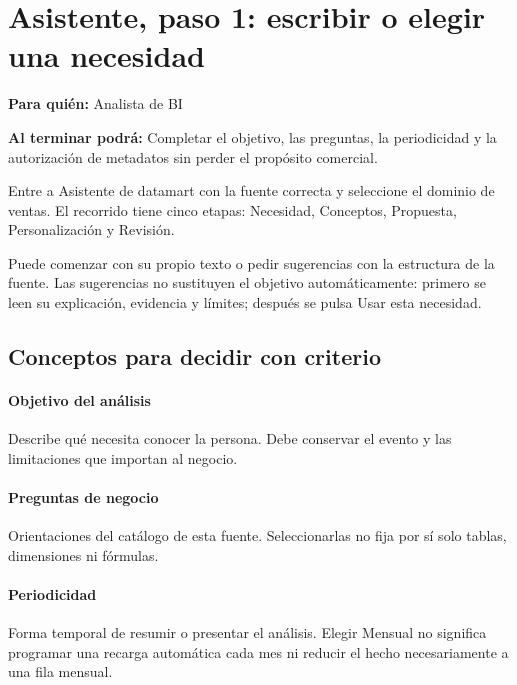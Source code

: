 
\section{Asistente, paso 1: escribir o elegir una necesidad}
\label{unidad:BI02}
\textbf{Para quién:} Analista de BI\par
\textbf{Al terminar podrá:} Completar el objetivo, las preguntas, la periodicidad y la autorización de metadatos sin perder el propósito comercial.

Entre a Asistente de datamart con la fuente correcta y seleccione el dominio de ventas. El recorrido tiene cinco etapas: Necesidad, Conceptos, Propuesta, Personalización y Revisión.

Puede comenzar con su propio texto o pedir sugerencias con la estructura de la fuente. Las sugerencias no sustituyen el objetivo automáticamente: primero se leen su explicación, evidencia y límites; después se pulsa Usar esta necesidad.

\subsection{Conceptos para decidir con criterio}
\paragraph{Objetivo del análisis} Describe qué necesita conocer la persona. Debe conservar el evento y las limitaciones que importan al negocio.

\paragraph{Preguntas de negocio} Orientaciones del catálogo de esta fuente. Seleccionarlas no fija por sí solo tablas, dimensiones ni fórmulas.

\paragraph{Periodicidad} Forma temporal de resumir o presentar el análisis. Elegir Mensual no significa programar una recarga automática cada mes ni reducir el hecho necesariamente a una fila mensual.

